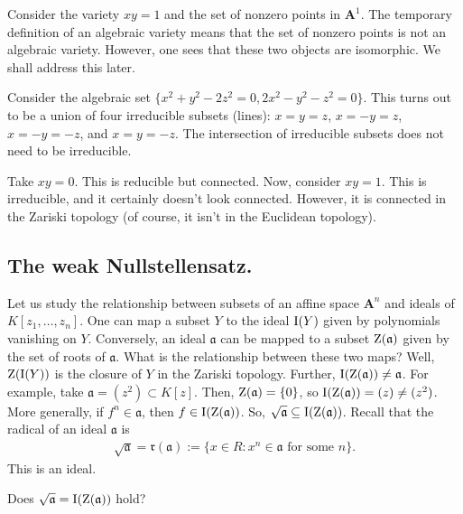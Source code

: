 \documentclass [11 pt, oneside] {article}
\begin{document}
\begin{example}[ ]\label{}
Consider the variety $xy=1$ and the set of nonzero points in $\mathbf{A}^1$. The temporary definition of an algebraic variety means that the set of nonzero points is not an algebraic variety. However, one sees that these two objects are isomorphic. We shall address this later.
\end{example}

\begin{example}[ ]\label{}
Consider the algebraic set $\{x^2+y^2 -2z^2=0, 2x^2 - y^2 - z^2=0\}$. This turns out to be a union of four irreducible subsets (lines): $x=y=z$, $x=-y=z$, $x=-y=-z$, and $x=y=-z$. The intersection of irreducible subsets does not need to be irreducible.
\end{example}

\begin{example}[ ]\label{}
Take $xy=0$. This is reducible but connected. Now, consider $xy=1$. This is irreducible, and it certainly doesn't look connected. However, it is connected in the Zariski topology (of course, it isn't in the Euclidean topology).
\end{example}


\subsection{The weak Nullstellensatz.}
Let us study the relationship between subsets of an affine space $\mathbf{A}^n$ and ideals of $K[z_1,\hdots, z_n]$. One can map a subset $Y$ to the ideal $\operatorname{I}(Y)$ given by polynomials vanishing on $Y$. Conversely, an ideal $\mathfrak{a}$ can be mapped to a subset $\operatorname{Z}(\mathfrak a)$ given by the set of roots of $\mathfrak{a}$. What is the relationship between these two maps? Well, $\operatorname{Z}(\operatorname{I}(Y))$ is the closure of $Y$ in the Zariski topology. Further, $\operatorname{I}(\operatorname{Z}(\mathfrak{a}))\ne \mathfrak{a}$. For example, take $\mathfrak{a}=(z^2)\subset K[z]$. Then, $\operatorname{Z}(\mathfrak{a}) = \{0\}$, so $\operatorname{I}(\operatorname{Z}(\mathfrak{a})) =(z)\ne (z^2)$. More generally, if $f^n\in \mathfrak{a}$, then $f\in \operatorname{I}(\operatorname{Z}(\mathfrak a))$. So, $\sqrt{\mathfrak{a}} \subseteq \operatorname{I}(\operatorname{Z}(\mathfrak{a}))$. Recall that the radical of an ideal ${\mathfrak a}$ is
\begin{align*}
	\sqrt{\mathfrak{a}} = \mathfrak{r}(\mathfrak{a}) := \{ x\in R : x^n \in \mathfrak{a} \textrm{ for some $n$}\}.
\end{align*}
This is an ideal.

\begin{problem}
	Does $\sqrt{\mathfrak{a}}= \operatorname{I}(\operatorname{Z}(\mathfrak{a})) $ hold?
\end{problem}
\end{document}
